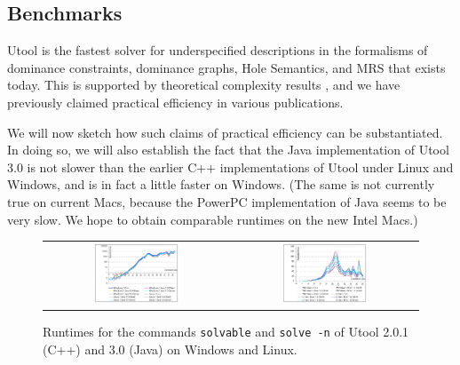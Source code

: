 \subsection{Benchmarks}

Utool is the fastest solver for underspecified descriptions in the
formalisms of dominance constraints, dominance graphs, Hole Semantics,
and MRS that exists today. This is supported by theoretical complexity
results
\cite{Althaus-J.Algo.,bodirsky-weakly-normal-constraints,KolTha05b},
and we have previously claimed practical efficiency in various
publications.

We will now sketch how such claims of practical efficiency can be
substantiated. In doing so, we will also establish the fact that the
Java implementation of Utool 3.0 is not slower than the earlier C++
implementations of Utool under Linux and Windows, and is in fact a
little faster on Windows. (The same is not currently true on current
Macs, because the PowerPC implementation of Java seems to be very
slow. We hope to obtain comparable runtimes on the new Intel Macs.)

\begin{figure}
\centering
\begin{tabular}{cc}
\includegraphics[width=0.48\textwidth]{jh-extraction-mean}
&
\includegraphics[width=0.48\textwidth]{jh-chart-mean}
\end{tabular}
\caption{Runtimes for the commands \texttt{solvable} and \texttt{solve -n}
of Utool 2.0.1 (C++) and 3.0 (Java) on Windows and Linux. \label{fig:runtimes}}
\end{figure}

